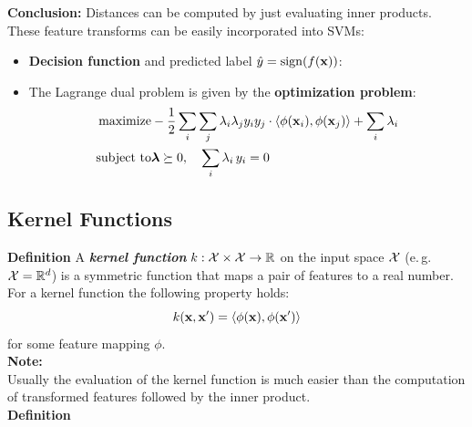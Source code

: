 	\textbf {Conclusion:} Distances can be computed by just evaluating inner products.
 	These feature transforms can be easily incorporated into SVMs: \\
	\begin{itemize}
		\item \textbf{Decision function} and predicted label $\hat y = \operatorname{sign}(f(\bm{\mathrm{x}}))$:
		      \begin{center}
			      \small
		      \end{center}
		      
		\item The Lagrange dual problem is given by the   \textbf{optimization problem}:
		      {\small
		      \begin{eqnarray*}
			      \mbox{maximize}   &  -\frac{1}{2} \sum_i \sum_j \lambda_i \lambda_j y_i y_j \cdot \langle\phi(\bm{\mathrm{x}}_i),\phi(\bm{\mathrm{x}}_j)\rangle + \sum_i \lambda_i \\     
			      \mbox{subject to} &  \bm{\mathrm{\lambda}}\succeq 0, \quad \sum_{i} \lambda_i \, y_i = 0
		      \end{eqnarray*}
		      }
	\end{itemize}

\subsection{Kernel Functions}

	 \textbf{Definition}
		A \textbf{\emph{kernel function}} $k: {\cal X} \times {\cal X}\rightarrow \mathbb{R}$ on the input space ${\cal X}$ (e.\,g.\ ${\cal X}=\mathbb{R}^d$) is a symmetric function that maps a pair of features to a real number. For a kernel function the following property holds:
		\begin{displaymath}
			k(\bm{\mathrm{x}}, \bm{\mathrm{x}}') = \langle\phi(\bm{\mathrm{x}}), \phi(\bm{\mathrm{x}}')\rangle
		\end{displaymath}
		for some feature mapping $\phi$.\\

	\textbf {Note:} \\

	Usually the evaluation of the kernel function is much easier than the computation of transformed features followed by the inner product.\\
   \textbf{Definition}\\

